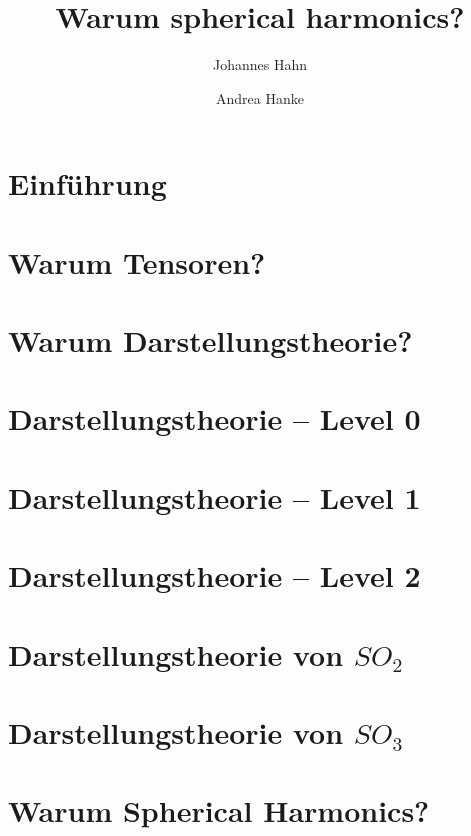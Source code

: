 \documentclass[fontsize=11pt,fleqn,a4paper]{scrartcl}
\author{Johannes Hahn \and Andrea Hanke}
\title{Warum spherical harmonics?}
\begin{document}
\maketitle

\tableofcontents

\setcounter{section}{-1}
\section{Einführung}

\section{Warum Tensoren?}



\section{Warum Darstellungstheorie?}




\section{Darstellungstheorie -- Level 0}



\section{Darstellungstheorie -- Level 1}




\section{Darstellungstheorie -- Level 2}


\section{Darstellungstheorie \texorpdfstring{von $SO_2$}{der zweidimensionalen Drehgruppe}}

\section{Darstellungstheorie \texorpdfstring{von $SO_3$}{der dreidimensionalen Drehgruppe}}


\section{Warum Spherical Harmonics?}

\end{document}
